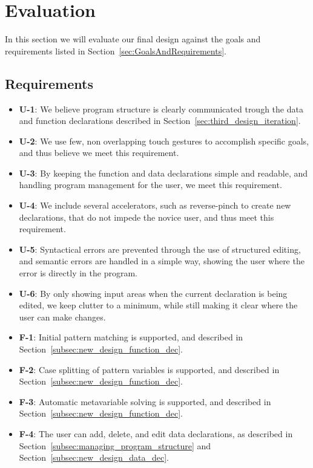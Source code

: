 \section{Evaluation}
\label{sec:Evaluation}
In this section we will evaluate our final design against the goals and requirements listed in Section~\ref{sec:GoalsAndRequirements}.

\subsection{Requirements}
\begin{itemize}
	\item \textbf{U-1}: We believe program structure is clearly communicated trough the data and function declarations described in Section~\ref{sec:third_design_iteration}.
	\item \textbf{U-2}: We use few, non overlapping touch gestures to accomplish specific goals, and thus believe we meet this requirement.
	\item \textbf{U-3}: By keeping the function and data declarations simple and readable, and handling program management for the user, we meet this requirement.
	\item \textbf{U-4}: We include several accelerators, such as reverse-pinch to create new declarations, that do not impede the novice user, and thus meet this requirement.
	\item \textbf{U-5}: Syntactical errors are prevented through the use of structured editing, and semantic errors are handled in a simple way, showing the user where the error is directly in the program.
	\item \textbf{U-6}: By only showing input areas when the current declaration is being edited, we keep clutter to a minimum, while still making it clear where the user can make changes.
	\item \textbf{F-1}: Initial pattern matching is supported, and described in Section~\ref{subsec:new_design_function_dec}.
	\item \textbf{F-2}: Case splitting of pattern variables is supported, and described in Section~\ref{subsec:new_design_function_dec}.
	\item \textbf{F-3}: Automatic metavariable solving is supported, and described in Section~\ref{subsec:new_design_function_dec}.
	\item \textbf{F-4}: The user can add, delete, and edit data declarations, as described in Section~\ref{subsec:managing_program_structure} and Section~\ref{subsec:new_design_data_dec}.

\end{itemize}
